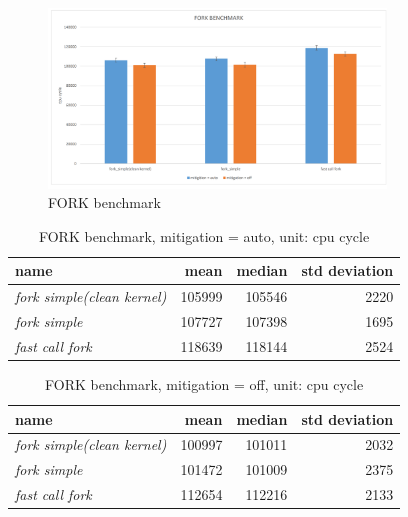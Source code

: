 \begin{figure}[H]
  \centering
  \includegraphics[width=0.8\textwidth]{images/FORK}
  \caption[FORK benchmark]{FORK benchmark}
   \label{fig:FORK}
\end{figure}


\begin{table}[htp]
  \centering
  \begin{tabular}{lrrr}
    \textbf{name} & \textbf{mean} & \textbf{median} & \textbf{std deviation} \\
    \hline
    \textit{fork simple(clean kernel)} & 105999 & 105546 & 2220\\
    \textit{fork simple} &107727 & 107398 & 1695\\
    \textit{fast call fork} & 118639 & 118144 & 2524\\

  \end{tabular}
  \caption[FORK benchmark, mitigation = auto]{FORK benchmark, mitigation = auto, unit: cpu cycle}
  \label{tab:numbers4}
\end{table}


\begin{table}[htp]
  \centering
  \begin{tabular}{lrrr}
    \textbf{name} & \textbf{mean} & \textbf{median} & \textbf{std deviation} \\
    \hline
    \textit{fork simple(clean kernel)} & 100997 & 101011 & 2032\\
    \textit{fork simple} &101472 & 101009 & 2375\\
    \textit{fast call fork} & 112654 & 112216 & 2133\\

  \end{tabular}
  \caption[FORK benchmark, mitigation = off]{FORK benchmark, mitigation = off, unit: cpu cycle}
  \label{tab:numbers5}
\end{table}

